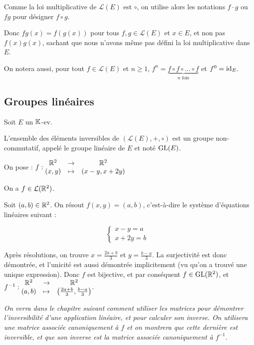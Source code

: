 \documentclass[12pt, a4paper]{report}
\begin{document}
\begin{remark}
    Comme la loi multiplicative de $\mathcal L(E)$ est $\circ$, on utilise alors les notations $f\cdot g$ ou $fg$ pour désigner $f \circ g$.

    Donc $fg(x) = f(g(x))$ pour tous $f,g \in \mathcal L(E)$ et $x \in E$, et non pas $f(x)g(x)$, sachant que nous n'avons même pas défini la loi multiplicative dans $E$.

    On notera aussi, pour tout $f \in \mathcal L(E)$ et $n\ge 1$, $f^n = \underbrace{f \circ f \circ \dots \circ f}_{n\text{ fois}}$ et $f^0 = \mathrm{id}_E$.

    \label{remarque:notation-multiplication-anneau-LE}
\end{remark}

\subsection{Groupes linéaires}

\begin{definition}
    Soit $E$ un $\mathbb{K}$-ev.

    L'ensemble des éléments inversibles de $(\mathcal L(E), +, \circ)$ est un groupe non-commutatif, appelé le groupe linéaire de $E$ et noté $\mathrm{GL}(E)$.
\end{definition}

\begin{example}
    On pose : $f : \begin{matrix}
        \mathbb{R}^2 &\to &\mathbb{R}^2\\
        (x,y) &\mapsto &(x-y,x+2y)
    \end{matrix}$

    On a $f \in \mathcal L(\mathbb{R}^2)$.

    Soit $(a,b) \in \mathbb{R}^2$. On résout $f(x,y) = (a,b)$, c'est-à-dire le système d'équations linéaires suivant :

    \[\begin{cases}
    x - y = a\\
    x + 2y = b
    \end{cases}\]

    Après résolutions, on trouve $x = \frac{2a + b}{3}$ et $y = \frac{b - a}{3}$. La surjectivité est donc démontrée, et l'unicité est aussi démontrée implicitement (vu qu'on a trouvé une unique expression). Donc $f$ est bijective, et par conséquent $f \in \mathrm{GL}(\mathbb{R}^2)$, et $f^{-1} : \begin{matrix}
        \mathbb{R}^2 &\to &\mathbb{R}^2\\
        (a,b) &\mapsto &\left(\frac{2a + b}{3}, \frac{b - a}{3}\right)
    \end{matrix}$.

    \textit{On verra dans le chapitre suivant comment utiliser les matrices pour démontrer l'inversibilité d'une application linéaire, et pour calculer son inverse. On utilisera une matrice associée canoniquement à $f$ et on montrera que cette dernière est inversible, et que son inverse est la matrice associée canoniquement à $f^{-1}$.}
\end{example}
\end{document}

